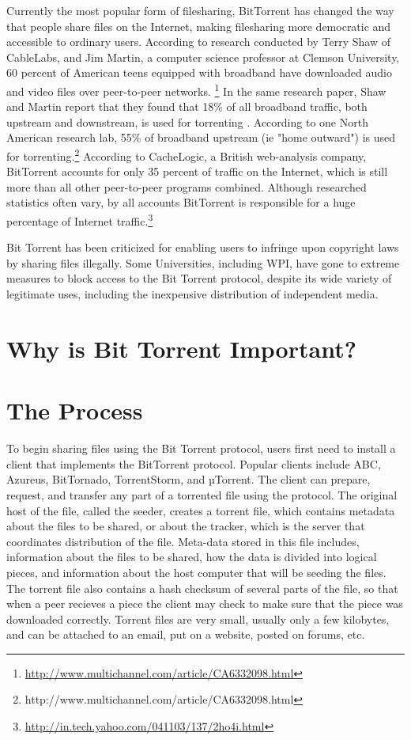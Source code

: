 \documentclass[a4paper,12pt]{report}
\begin{document}
Currently the most popular form of filesharing, BitTorrent has changed the way that people share files on the Internet, making filesharing more democratic and accessible to ordinary users.
According to research conducted by Terry Shaw of CableLabs, and Jim Martin, a computer science professor at Clemson University, 60 percent of American teens equipped with broadband have downloaded audio and video files over peer-to-peer networks. \footnote { \url{http://www.multichannel.com/article/CA6332098.html}}
In the same research paper, Shaw and Martin report that they found that 18\% of all broadband traffic, both upstream and downstream, is used for torrenting .
According to one North American research lab, 55\% of broadband upstream (ie "home outward") is used for torrenting.\footnote{http://www.multichannel.com/article/CA6332098.html}
According to CacheLogic, a British web-analysis company, BitTorrent accounts for only 35 percent of traffic on the Internet, which is still more than all other peer-to-peer programs combined.  
Although researched statistics often vary, by all accounts BitTorrent is responsible for a huge percentage of Internet traffic.\footnote {\url{http://in.tech.yahoo.com/041103/137/2ho4i.html}}

Bit Torrent has been criticized for enabling users to infringe upon copyright laws by sharing files illegally. Some Universities, including WPI, have gone to extreme measures to block access to the Bit Torrent protocol, despite its wide variety of legitimate uses, including the inexpensive distribution of independent media.


\section{Why is Bit Torrent Important?}

\section{The Process}
To begin sharing files using the Bit Torrent protocol, users first need to install a client that implements the BitTorrent protocol.
Popular clients include ABC, Azureus, BitTornado, TorrentStorm, and µTorrent. The client can prepare, request, and transfer any part of a torrented file using the protocol.
The original host of the file, called the seeder, creates a torrent file, which contains metadata about the files to be shared, or about the tracker, which is the server that coordinates distribution of the file.
Meta-data stored in this file includes, information about the files to be shared, how the data is divided into logical pieces, and information about the host computer that will be seeding the files. The torrent file also contains a hash checksum of several parts of the file, so that when a peer recieves a piece the client may check to make sure that the piece was downloaded correctly.
Torrent files are very small, usually only a few kilobytes, and can be attached to an email, put on a website, posted on forums, etc.
\end{document}
